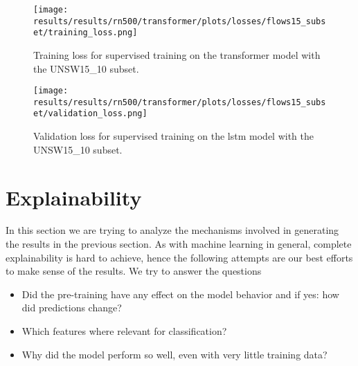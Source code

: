 











\begin{figure}[h]
	\centering
	\texttt{[image: results/results/rn500/transformer/plots/losses/flows15\_subset/training\_loss.png]}
	\caption{Training loss for supervised training on the transformer model with the UNSW15\_10 subset.}
	\label{fig:results:transformer:training_loss_flows15_subset}
\end{figure}

\begin{figure}[h]
	\centering
	\texttt{[image: results/results/rn500/transformer/plots/losses/flows15\_subset/validation\_loss.png]}
	\caption{Validation loss for supervised training on the \gls{lstm} model with the UNSW15\_10 subset.}
	\label{fig:results:transformer:validation_loss_flows15_subset}
\end{figure}


\section{Explainability}

In this section we are trying to analyze the mechanisms involved in generating the results in the previous section. As with machine learning in general, complete explainability is hard to achieve, hence the following attempts are our best efforts to make sense of the results. We try to answer the questions

\begin{itemize}
	\item Did the pre-training have any effect on the model behavior and if yes: how did predictions change?
	\item Which features where relevant for classification? 
	\item Why did the model perform so well, even with very little training data?
\end{itemize}

